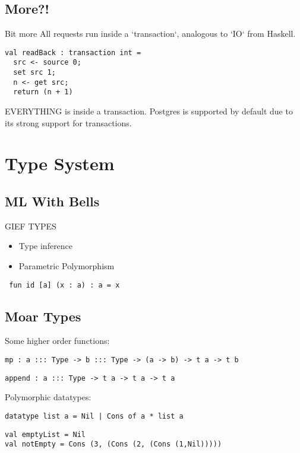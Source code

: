 \documentclass[aspectratio=169]{beamer}
\begin{document}
\subsection{More?!}
\begin{frame}[fragile]{Bit more}
All requests run inside a `transaction`, analogous to `IO` from Haskell.
\begin{verbatim}
val readBack : transaction int =
  src <- source 0;
  set src 1;
  n <- get src;
  return (n + 1)
\end{verbatim}
EVERYTHING is inside a transaction. Postgres is supported by default due to its strong support for transactions.
\end{frame}

\section{Type System}
\subsection{ML With Bells}
\begin{frame}[fragile]{GIEF TYPES}
\begin{itemize}
\item Type inference
\item Parametric Polymorphism
\end{itemize}
\begin{verbatim} fun id [a] (x : a) : a = x \end{verbatim}
\end{frame}

\subsection{Moar Types}
\begin{frame}[fragile]
Some higher order functions:
\begin{verbatim}
mp : a ::: Type -> b ::: Type -> (a -> b) -> t a -> t b
\end{verbatim}
\begin{verbatim}
append : a ::: Type -> t a -> t a -> t a
\end{verbatim}
Polymorphic datatypes:
\begin{verbatim}
datatype list a = Nil | Cons of a * list a
\end{verbatim}
\begin{verbatim}
val emptyList = Nil
val notEmpty = Cons (3, (Cons (2, (Cons (1,Nil)))))
\end{verbatim}
\end{frame}
\end{document}
